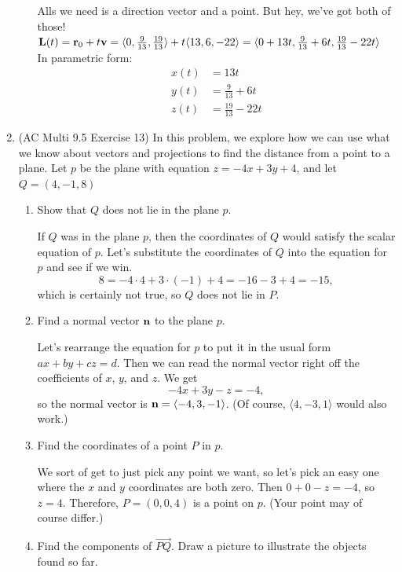 \begin{enumerate}[leftmargin=0pt]
\begin{enumerate}
	\begin{red}
		Alls we need is a direction vector and a point. But hey, we've got both of those! \\
		$\mathbf{L}(t) = \mathbf{r}_0 + t \mathbf{v} 
		= \langle 0, \tfrac{9}{13}, \tfrac{19}{13} \rangle 
		+ t \langle 13, 6, -22 \rangle
		= \langle 0 + 13t, \tfrac{9}{13} + 6t, \tfrac{19}{13} - 22t \rangle$ \\
		In parametric form:
		\begin{align*}
			x(t) &= 13t\\
			y(t) &= \tfrac{9}{13} + 6t\\
			z(t) &= \tfrac{19}{13} - 22t
		\end{align*}
	\end{red}
\end{enumerate}

\item  (AC Multi 9.5 Exercise 13) In this problem, we explore how we can use what we know about vectors and projections to find the distance from a point to a plane. Let $p$ be the plane with equation $z=-4x+3y+4$, and let $Q = (4, -1, 8)$
\begin{enumerate}
    \item Show that $Q$ does not lie in the plane $p$.
    
    \begin{red}
    If $Q$ was in the plane $p$, then the coordinates of $Q$ would satisfy the scalar equation of $p$. Let's substitute the coordinates of $Q$ into the equation for $p$ and see if we win.
    \[8 = -4\cdot 4 + 3\cdot (-1) + 4 = -16 - 3 + 4 = -15,\]
    which is certainly not true, so $Q$ does not lie in $P$.
    \end{red}
    \item Find a normal vector $\mathbf{n}$ to the plane $p$.
    
    \begin{red}
    Let's rearrange the equation for $p$ to put it in the usual form $ax + by + cz = d$. Then we can read the normal vector right off the coefficients of $x$, $y$, and $z$. We get
    \[-4x + 3y - z = -4,\] so the normal vector is $\mathbf{n} = \langle -4, 3, -1\rangle$. (Of course, $\langle 4, -3, 1\rangle$ would also work.)
    \end{red}
    \item Find the coordinates of a point $P$ in $p$.
    
    \begin{red}
    We sort of get to just pick any point we want, so let's pick an easy one where the $x$ and $y$ coordinates are both zero. Then $0 + 0 - z = -4$, so $z=4$. Therefore, $P = (0, 0, 4)$ is a point on $p$. (Your point may of course differ.)
    \end{red}
    \item Find the components of $\overrightarrow{PQ}$. Draw a picture to illustrate the objects found so far.
    

\end{enumerate}
\end{enumerate}

